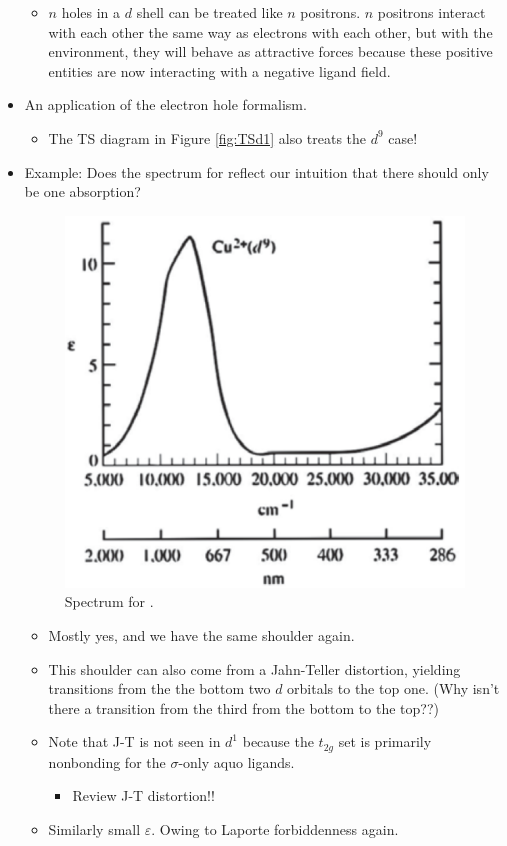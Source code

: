 \documentclass[../notes.tex]{subfiles}
\begin{document}
\begin{itemize}
    \begin{itemize}
        \item $n$ holes in a $d$ shell can be treated like $n$ positrons. $n$ positrons interact with each other the same way as electrons with each other, but with the environment, they will behave as attractive forces because these positive entities are now interacting with a negative ligand field.
    \end{itemize}
    \item An application of the electron hole formalism.
    \begin{itemize}
        \item The TS diagram in Figure \ref{fig:TSd1} also treats the $d^9$ case!
    \end{itemize}
    \item Example: Does the spectrum for  reflect our intuition that there should only be one absorption?
    \begin{figure}[H]
        \centering
        \includegraphics[width=0.35\linewidth]{../ExtFiles/spectrumCu2.png}
        \caption{Spectrum for .}
        \label{fig:spectrumCu2}
    \end{figure}
    \begin{itemize}
        \item Mostly yes, and we have the same shoulder again.
        \item This shoulder can also come from a Jahn-Teller distortion, yielding transitions from the the bottom two $d$ orbitals to the top one. (Why isn't there a transition from the third from the bottom to the top??)
        \item Note that J-T is not seen in $d^1$ because the $t_{2g}$ set is primarily nonbonding for the $\sigma$-only aquo ligands.
        \begin{itemize}
            \item Review J-T distortion!!
        \end{itemize}
        \item Similarly small $\varepsilon$. Owing to Laporte forbiddenness again.

\end{itemize}
\end{itemize}
\end{document}
